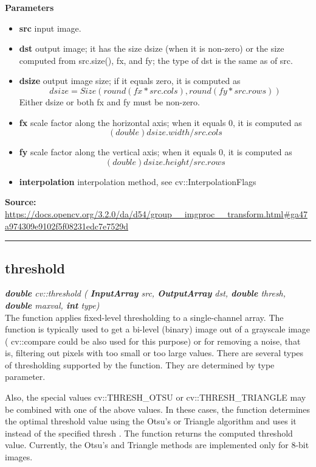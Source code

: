 \textbf{Parameters}
\begin{itemize}
    \item \textbf{src} input image.
    \item \textbf{dst} output image; it has the size dsize (when it is non-zero) or the size computed from src.size(), fx, and fy; the type of dst is the same as of src.
    \item \textbf{dsize} output image size; if it equals zero, it is computed as $$dsize = Size(round(fx*src.cols), round(fy*src.rows))$$
    Either dsize or both fx and fy must be non-zero.
    \item \textbf{fx} scale factor along the horizontal axis; when it equals 0, it is computed as $$(double)dsize.width/src.cols$$
    \item \textbf{fy}	scale factor along the vertical axis; when it equals 0, it is computed as $$(double)dsize.height/src.rows$$
    \item \textbf{interpolation}	interpolation method, see cv::InterpolationFlags
\end{itemize}
   
\textbf{Source:} \url{https://docs.opencv.org/3.2.0/da/d54/group__imgproc__transform.html#ga47a974309e9102f5f08231edc7e7529d}

\noindent\rule{\textwidth}{0.5pt}


\subsection*{threshold}
\label{subsec:opencv_appendix_used_functions_threshold}

\textit{\textbf{double} cv::threshold (
        \textbf{InputArray} src,
		\textbf{OutputArray}  	dst,
		\textbf{double}  	thresh,
		\textbf{double}  	maxval,
		\textbf{int}  	type)}\\

The function applies fixed-level thresholding to a single-channel array. The function is typically used to get a bi-level (binary) image out of a grayscale image ( cv::compare could be also used for this purpose) or for removing a noise, that is, filtering out pixels with too small or too large values. There are several types of thresholding supported by the function. They are determined by type parameter.

Also, the special values cv::THRESH\_OTSU or cv::THRESH\_TRIANGLE may be combined with one of the above values. In these cases, the function determines the optimal threshold value using the Otsu's or Triangle algorithm and uses it instead of the specified thresh . The function returns the computed threshold value. Currently, the Otsu's and Triangle methods are implemented only for 8-bit images.\\

